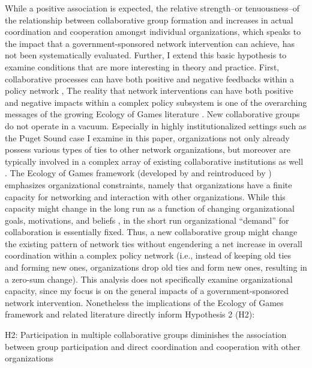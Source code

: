 \documentclass[12pt,a4paper,titlepage]{article}
\begin{document}
While a positive association is expected, the relative strength--or tenuousness--of the relationship between collaborative group formation and increases in actual coordination and cooperation amongst individual organizations, which speaks to the impact that a government-sponsored network intervention can achieve, has not been systematically evaluated. Further, I extend this basic hypothesis to examine conditions that are more interesting in theory and practice. First, collaborative processes can have both positive and negative feedbacks within a policy network \parencite{gerlak2012}, The reality that network interventions can have both positive and negative impacts within a complex policy subsystem is one of the overarching messages of the growing Ecology of Games literature \parencite{berardo2010, lubell2010,lubell2011-a, mcallister2014, smaldino2014, niles2012}. New collaborative groups do not operate in a vacuum. Especially in highly institutionalized settings such as the Puget Sound case I examine in this paper, organizations not only already possess various types of ties to other network organizations, but moreover are typically involved in a complex array of existing collaborative institutions as well \parencite[see][]{lubell2013, lubell2011-a}. The Ecology of Games framework (developed by \textcite{long1958} and reintroduced by \textcite{lubell2010}) emphasizes organizational constraints, namely that organizations have a finite capacity for networking and interaction with other organizations. While this capacity might change in the long run as a function of changing organizational goals, motivations, and beliefs \parencite[e.g.,][]{bingham2008,innes2010,leach2005,lubell2005}, in the short run organizational ``demand'' for collaboration is essentially fixed. Thus, a new collaborative group might change the existing pattern of network ties without engendering a net increase in overall coordination within a complex policy network (i.e., instead of keeping old ties and forming new ones, organizations drop old ties and form new ones, resulting in a zero-sum change). This analysis does not specifically examine organizational capacity, since my focus is on the general impacts of a government-sponsored network intervention. Nonetheless the implications of the Ecology of Games framework and related literature directly inform Hypothesis 2 (H2):

\singlespacing
\begin{description}
\item{H2: Participation in multiple collaborative groups diminishes the association between group participation and direct coordination and cooperation with other organizations}
\end{description}
\doublespacing
\end{document}
